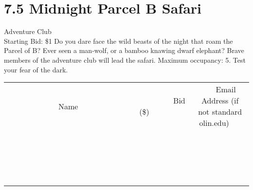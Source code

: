 \documentclass[11pt]{article}
\begin{document}
\section*{7.5 Midnight Parcel B Safari}
Adventure Club
\\
Starting Bid: \$1
\newline
Do you dare face the wild beasts of the night that roam the Parcel of B? Ever seen a man-wolf, or a bamboo knawing dwarf elephant? Brave members of the adventure club will lead the safari. Maximum occupancy: 5. Test your fear of the dark.
\\[3ex]
\begin{tabular}{c c c}
~~~~~~~~~~~~~Name~~~~~~~~~~~~~ & ~~~~~~~~~Bid (\$)~~~~~~~~~  & ~~~Email Address (if not standard olin.edu)~~~\\
 & & \\
\hline
 & & \\
\hline
 & & \\
\hline
 & & \\
\hline
 & & \\
\hline
 & & \\
\hline
 & & \\
\hline
 & & \\
\hline
 & & \\
\hline
 & & \\
\hline
 & & \\
\hline
 & & \\
\hline
 & & \\
\hline
 & & \\
\hline
 & & \\
\hline
 & & \\
\hline
 & & \\
\hline
 & & \\
\hline
 & & \\
\hline
\end{tabular}
\newpage
\end{document}
